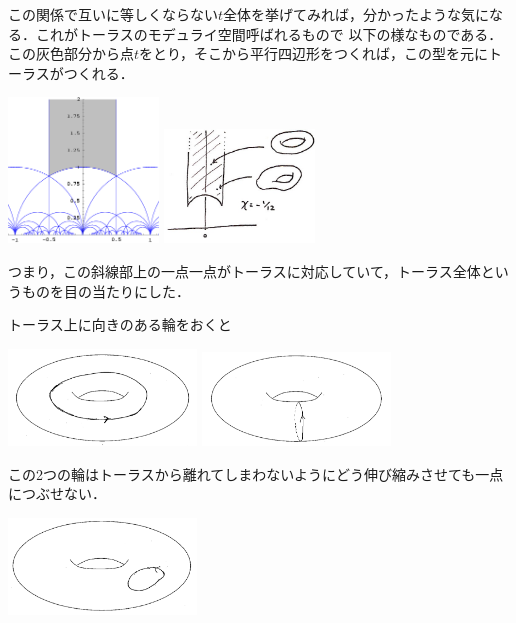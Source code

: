 この関係で互いに等しくならない$t$全体を挙げてみれば，分かったような気になる．これがトーラスのモデュライ空間呼ばれるもので
以下の様なものである．この灰色部分から点$t$をとり，そこから平行四辺形をつくれば，この型を元にトーラスがつくれる．

\begin{center}
  \includegraphics[width=4cm]{asaka8.png}
  \includegraphics[width=4cm]{asaka9.jpg}
\end{center}

つまり，この斜線部上の一点一点がトーラスに対応していて，トーラス全体というものを目の当たりにした．

トーラス上に向きのある輪をおくと
\begin{center}
\includegraphics[width=5cm]{asaka10.png}
\includegraphics[width=5cm]{asaka101.png}
\end{center}
この2つの輪はトーラスから離れてしまわないようにどう伸び縮みさせても一点につぶせない．
\begin{center}
\includegraphics[width=5cm]{asaka11.png}
\end{center}

